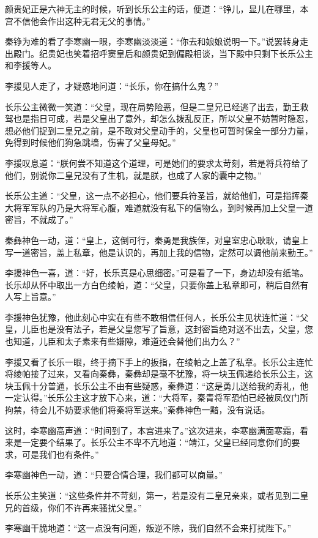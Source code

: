 颜贵妃正是六神无主的时候，听到长乐公主的话，便道：“铮儿，显儿在哪里，本宫不信他会作出这种无君无父的事情。”

秦铮为难的看了李寒幽一眼，李寒幽淡淡道：“你去和娘娘说明一下。”说罢转身走出殿门。纪贵妃也笑着招呼窦皇后和颜贵妃到偏殿相谈，当下殿中只剩下长乐公主和李援等人。

李援见人走了，才疑惑地问道：“长乐，你在搞什么鬼？”

长乐公主微微一笑道：“父皇，现在局势险恶，但是二皇兄已经逃了出去，勤王救驾也是指日可成，若是父皇出了意外，却怎么拨乱反正，所以父皇不妨暂时隐忍，想必他们捉到二皇兄之前，是不敢对父皇动手的，父皇也可暂时保全一部分力量，免得到时候他们狗急跳墙，伤害了父皇母妃。”

李援叹息道：“朕何尝不知道这个道理，可是她们的要求太苛刻，若是将兵符给了他们，别说你二皇兄没有了生机，就是朕，也成了人家的囊中之物。”

长乐公主道：“父皇，这一点不必担心，他们要兵符圣旨，就给他们，可是指挥秦大将军军队的乃是大将军心腹，难道就没有私下的信物么，到时候再加上父皇一道密旨，不就成了。”

秦彝神色一动，道：“皇上，这倒可行，秦勇是我族侄，对皇室忠心耿耿，请皇上写一道密旨，盖上私章，他是认识的，再加上我的信物，定然可以调他前来勤王。”

李援神色一喜，道：“好，长乐真是心思细密。”可是看了一下，身边却没有纸笔。长乐却从怀中取出一方白色绫帕，道：“父皇，只要你盖上私章即可，稍后自然有人写上旨意。”

李援神色犹豫，他此刻心中实在有些不敢相信任何人，长乐公主见状连忙道：“父皇，儿臣也是没有法子，若是父皇您写了旨意，这封密旨绝对送不出去，父皇，您也知道，儿臣和太子素来有些嫌隙，难道还会替他们出力么？”

李援又看了长乐一眼，终于摘下手上的扳指，在绫帕之上盖了私章。长乐公主连忙将绫帕接了过来，又看向秦彝，秦彝却是毫不犹豫，将一块玉佩递给长乐公主，这块玉佩十分普通，长乐公主不由有些疑惑，秦彝道：“这是勇儿送给我的寿礼，他一定认得。”长乐公主这才放下心来，道：“大将军，秦青将军恐怕已经被凤仪门所拘禁，待会儿不妨要求他们将秦将军送来。”秦彝神色一黯，没有说话。

这时，李寒幽高声道：“时间到了，本宫进来了。”这次进来，李寒幽满面寒霜，看来是一定要个结果了。长乐公主不卑不亢地道：“靖江，父皇已经同意你们的要求，可是我们也有条件。”

李寒幽神色一动，道：“只要合情合理，我们都可以商量。”

长乐公主笑道：“这些条件并不苛刻，第一，若是没有二皇兄亲来，或者见到二皇兄的首级，你们不许再来骚扰父皇。”

李寒幽干脆地道：“这一点没有问题，叛逆不除，我们自然不会来打扰陛下。”

